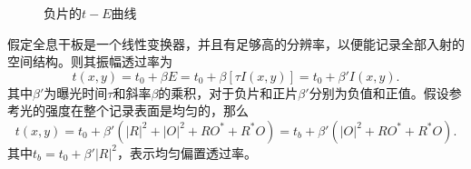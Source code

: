 \documentclass[UTF8]{ctexart}
\begin{document}
\begin{enumerate}
\begin{figure}[htbp]
        \caption{负片的$t-E$曲线}
    \end{figure}
    假定全息干板是一个线性变换器，并且有足够高的分辨率，以便能记录全部入射的空间结构。则其振幅透过率为
    \begin{equation}
        t\left(x,y\right)=t_0+\beta E = t_0 + \beta\left[\tau I\left(x,y\right)\right] = t_0 + \beta'I\left(x,y\right).
    \end{equation}
    其中$\beta'$为曝光时间$\tau$和斜率$\beta$的乘积，对于负片和正片$\beta'$分别为负值和正值。假设参考光的强度在整个记录表面是均匀的，那么
    \begin{equation}
        t\left( {x,y} \right) = {t_0} + \beta '\left( {{{\left| R \right|}^2} + {{\left| O \right|}^2} + R{O^*} + {R^*}O} \right) = {t_b} + \beta '\left( {{{\left| O \right|}^2} + R{O^*} + {R^*}O} \right).
    \end{equation}
    其中$t_b=t_0+\beta'\left|R\right|^2$，表示均匀偏置透过率。
\end{enumerate}
\end{document}
